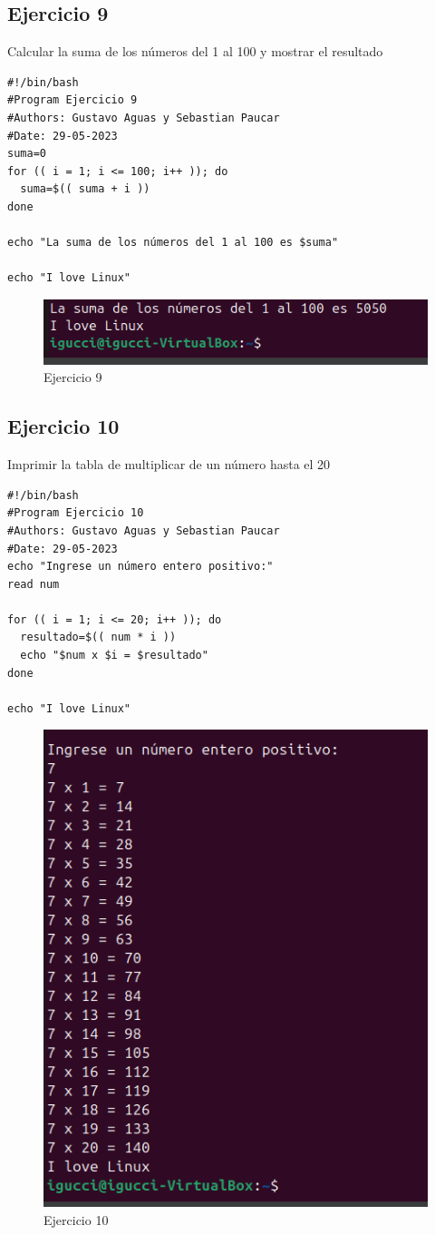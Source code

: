 \documentclass[11pt,twoside]{book}
\begin{document}
\subsection{Ejercicio 9}
 Calcular la suma de los números del 1 al 100 y mostrar el resultado
\begin{lstlisting}
#!/bin/bash
#Program Ejercicio 9
#Authors: Gustavo Aguas y Sebastian Paucar
#Date: 29-05-2023
suma=0
for (( i = 1; i <= 100; i++ )); do
  suma=$(( suma + i ))
done

echo "La suma de los números del 1 al 100 es $suma"

echo "I love Linux"

\end{lstlisting}

\begin{figure}[h]
    \centering
    \includegraphics[width=0.5\linewidth]{Ej9.png}
    \caption{Ejercicio 9}
\end{figure}
\newpage
\subsection{Ejercicio 10}
Imprimir la tabla de multiplicar de un número hasta el 20

\begin{lstlisting}
#!/bin/bash
#Program Ejercicio 10
#Authors: Gustavo Aguas y Sebastian Paucar
#Date: 29-05-2023
echo "Ingrese un número entero positivo:"
read num

for (( i = 1; i <= 20; i++ )); do
  resultado=$(( num * i ))
  echo "$num x $i = $resultado"
done

echo "I love Linux"

\end{lstlisting}

\begin{figure}[h]
    \centering
    \includegraphics[width=0.5\linewidth]{Ej10.png}
    \caption{Ejercicio 10}
\end{figure}
\newpage
\end{document}
